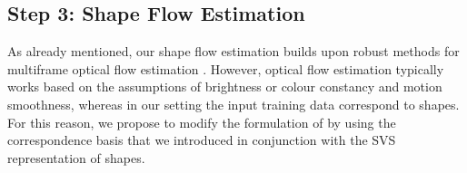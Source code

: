 
{\label{sec:step3}\subsection*{Step 3: Shape Flow Estimation}}



As already mentioned, our shape flow estimation builds upon robust methods for multiframe optical flow estimation \cite{Garg:2013hu}. However, optical flow estimation typically works based on the assumptions of brightness or colour constancy and motion smoothness, whereas in our setting the input training data correspond to shapes. For this reason, we propose to modify the formulation of \cite{Garg:2013hu} by using the correspondence basis that we introduced in conjunction with the SVS representation of shapes.


%



